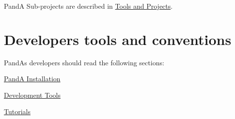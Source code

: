PandA Sub-\/projects are described in \hyperlink{src_main_page}{Tools and Projects}.\hypertarget{PandA_DOC_dev_info}{}\section{Developers tools and conventions}\label{PandA_DOC_dev_info}
PandA\textquotesingle{}s developers should read the following sections\+:
\begin{DoxyItemize}
\item \hyperlink{panda_install}{PandA Installation}
\item \hyperlink{panda_sdk}{Development Tools}
\item \hyperlink{tutorials_page}{Tutorials} 
\end{DoxyItemize}